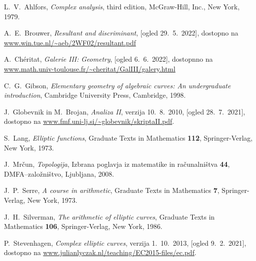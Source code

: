 \documentclass[mat1]{fmfdelo}
\numberwithin{equation}{section}
\theoremstyle{definition}
\begin{document}

\begin{thebibliography}{99}
    
        L.~V.~Ahlfors, \emph{Complex analysis}, third edition, McGraw-Hill, Inc., New York, 1979.

        A.~E.~Brouwer, \emph{Resultant and discriminant}, [ogled 29.~5.~2022], dostopno na \url{www.win.tue.nl/~aeb/2WF02/resultant.pdf}

        A.~Chéritat, \emph{Galerie III: Geometry}, [ogled 6.~6.~2022], dostopnno na \url{www.math.univ-toulouse.fr/~cheritat/GalIII/galery.html}

        C.~G.~Gibson, \emph{Elementary geometry of algebraic curves: An undergraduate introduction}, Cambridge University Press, Cambridge, 1998.

        J.~Globevnik in M.~Brojan, \emph{Analiza II}, verzija 10.~8.~2010, [ogled 28.~7.~2021], dostopno na \url{www.fmf.uni-lj.si/~globevnik/skriptaII.pdf}.
    
        S.~Lang, \emph{Elliptic functions}, Graduate Texts in Mathematics \textbf{112}, Springer-Verlag, New York, 1973.

        J.~Mrčun, \emph{Topologija}, Izbrana poglavja iz matematike in računalništva \textbf{44}, DMFA--založništvo, Ljubljana, 2008.
    
        J.~P.~Serre, \emph{A course in arithmetic}, Graduate Texts in Mathematics \textbf{7}, Springer-Verlag, New York, 1973.

        J.~H.~Silverman, \emph{The arithmetic of elliptic curves}, Graduate Texts in Mathematics \textbf{106}, Springer-Verlag, New York, 1986.

        P.~Stevenhagen, \emph{Complex elliptic curves}, verzija 1.~10.~2013, [ogled 9.~2.~2021], dostopno na \url{www.julianlyczak.nl/teaching/EC2015-files/ec.pdf}.

    
    
\end{thebibliography}
\end{document}
